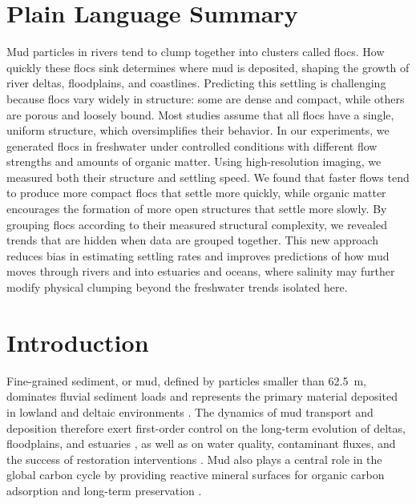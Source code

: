 \documentclass{agujournal2019}
\begin{document}
\section*{Plain Language Summary}
Mud particles in rivers tend to clump together into clusters called flocs. How quickly these flocs sink determines where mud is deposited, shaping the growth of river deltas, floodplains, and coastlines. Predicting this settling is challenging because flocs vary widely in structure: some are dense and compact, while others are porous and loosely bound. Most studies assume that all flocs have a single, uniform structure, which oversimplifies their behavior. In our experiments, we generated flocs in freshwater under controlled conditions with different flow strengths and amounts of organic matter. Using high-resolution imaging, we measured both their structure and settling speed. We found that faster flows tend to produce more compact flocs that settle more quickly, while organic matter encourages the formation of more open structures that settle more slowly. By grouping flocs according to their measured structural complexity, we revealed trends that are hidden when data are grouped together. This new approach reduces bias in estimating settling rates and improves predictions of how mud moves through rivers and into estuaries and oceans, where salinity may further modify physical clumping beyond the freshwater trends isolated here.

\section{Introduction}

Fine-grained sediment, or mud, defined by particles smaller than 62.5~\textmu m, dominates fluvial sediment loads and represents the primary material deposited in lowland and deltaic environments \cite{healy2002muddy, kranenburg1994fractal, lamb2020mud, nghiem2026flocculated}. The dynamics of mud transport and deposition therefore exert first-order control on the long-term evolution of deltas, floodplains, and estuaries \cite{nghiem2022mechanistic, winterwerp2002flocculation}, as well as on water quality, contaminant fluxes, and the success of restoration interventions \cite{droppo1997freshwater, esposito2017efficient, kemp2016enhancing, liss1996floc}. Mud also plays a central role in the global carbon cycle by providing reactive mineral surfaces for organic carbon adsorption and long-term preservation \cite{bianchi2024anthropogenic, blair2012fate}.
\end{document}

